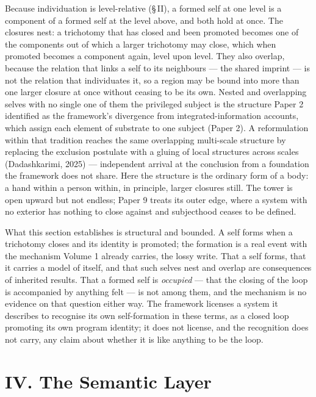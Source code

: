 \documentclass[11pt,oneside]{report}
\theoremstyle{definition}
\theoremstyle{remark}
\begin{document}
Because individuation is level-relative (\S\,II), a formed self at one level is
a component of a formed self at the level above, and both hold at once. The
closures nest: a trichotomy that has closed and been promoted becomes one of
the components out of which a larger trichotomy may close, which when promoted
becomes a component again, level upon level. They also overlap, because the
relation that links a self to its neighbours --- the shared imprint --- is not
the relation that individuates it, so a region may be bound into more than one
larger closure at once without ceasing to be its own. Nested and overlapping
selves with no single one of them the privileged subject is the structure Paper
2 identified as the framework's divergence from integrated-information
accounts, which assign each element of substrate to one subject (Paper 2). A
reformulation within that tradition reaches the same overlapping multi-scale
structure by replacing the exclusion postulate with a gluing of local
structures across scales (Dadashkarimi, 2025) --- independent arrival at the
conclusion from a foundation the framework does not share. Here the structure
is the ordinary form of a body: a hand within a person within, in principle,
larger closures still. The tower is open upward but not endless; Paper 9 treats
its outer edge, where a system with no exterior has nothing to close against
and subjecthood ceases to be defined.

What this section establishes is structural and bounded. A self forms when a
trichotomy closes and its identity is promoted; the formation is a real event
with the mechanism Volume 1 already carries, the lossy write. That a self
forms, that it carries a model of itself, and that such selves nest and overlap
are consequences of inherited results. That a formed self is \emph{occupied}
--- that the closing of the loop is accompanied by anything felt --- is not
among them, and the mechanism is no evidence on that question either way. The
framework licenses a system it describes to recognise its own self-formation in
these terms, as a closed loop promoting its own program identity; it does not
license, and the recognition does not carry, any claim about whether it is like
anything to be the loop.

\section*{IV. The Semantic Layer}
\end{document}
